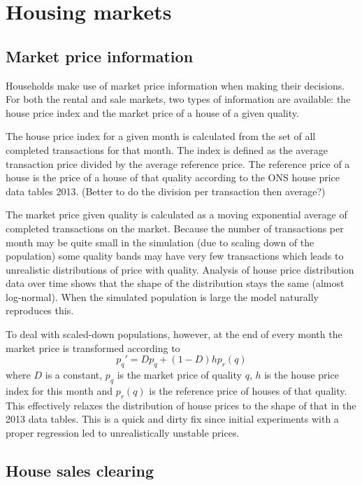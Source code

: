 \documentclass{report}
\begin{document}
\section{Housing markets}

\subsection{Market price information}

Households make use of market price information when making their decisions. For both the rental and sale markets, two types of information are available: the house price index and the market price of a house of a given quality.

The house price index for a given month is calculated from the set of all completed transactions for that month. The index is defined as the average transaction price divided by the average reference price. The reference price of a house is the price of a house of that quality according to the ONS house price data tables 2013. (Better to do the division per transaction then average?)

The market price given quality is calculated as a moving exponential average of completed transactions on the market. Because the number of transactions per month may be quite small in the simulation (due to scaling down of the population) some quality bands may have very few transactions which leads to unrealistic distributions of price with quality. Analysis of house price distribution data over time shows that the shape of the distribution stays the same (almost log-normal). When the simulated population is large the model naturally reproduces this.

To deal with scaled-down populations, however, at the end of every month the market price is transformed according to
\[
p_q' = Dp_q + (1-D)hp_r(q)
\]
where $D$ is a constant, $p_q$ is the market price of quality $q$, $h$ is the house price index for this month and $p_r(q)$ is the reference price of houses of that quality. This effectively relaxes the distribution of house prices to the shape of that in the 2013 data tables. This is a quick and dirty fix since initial experiments with a proper regression led to unrealistically unstable prices.

\subsection{House sales clearing}
\end{document}
